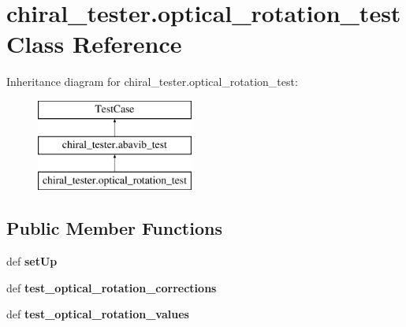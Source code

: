 \hypertarget{classchiral__tester_1_1optical__rotation__test}{\section{chiral\+\_\+tester.\+optical\+\_\+rotation\+\_\+test Class Reference}
\label{classchiral__tester_1_1optical__rotation__test}
}
Inheritance diagram for chiral\+\_\+tester.\+optical\+\_\+rotation\+\_\+test\+:\begin{figure}[H]
\begin{center}
\leavevmode
\includegraphics[height=3.000000cm]{classchiral__tester_1_1optical__rotation__test}
\end{center}
\end{figure}
\subsection*{Public Member Functions}
\begin{DoxyCompactItemize}
\item 
\hypertarget{classchiral__tester_1_1optical__rotation__test_a6b6e93715f34310786f38ab4f44e5e70}{def {\bfseries set\+Up}}\label{classchiral__tester_1_1optical__rotation__test_a6b6e93715f34310786f38ab4f44e5e70}

\item 
\hypertarget{classchiral__tester_1_1optical__rotation__test_af59471763111452bf72cd62425062ee0}{def {\bfseries test\+\_\+optical\+\_\+rotation\+\_\+corrections}}\label{classchiral__tester_1_1optical__rotation__test_af59471763111452bf72cd62425062ee0}

\item 
\hypertarget{classchiral__tester_1_1optical__rotation__test_a1a3bab35383a0489e43d32a212776b74}{def {\bfseries test\+\_\+optical\+\_\+rotation\+\_\+values}}\label{classchiral__tester_1_1optical__rotation__test_a1a3bab35383a0489e43d32a212776b74}

\end{DoxyCompactItemize}
